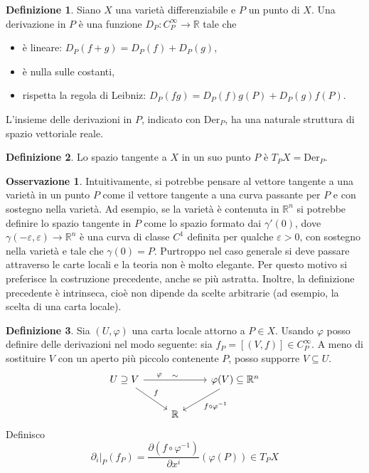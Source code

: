 \documentclass[a4paper,11pt]{article}
\theoremstyle{definition}
\newtheorem{osservazione}{Osservazione}[section]
\newtheorem{definizione}{Definizione}[section]
\theoremstyle{theorem}
\newcommand{\der}[1]{\mathrm{Der}_#1}
\begin{document}
\begin{definizione}
	Siano $X$ una varietà differenziabile e $P$ un punto di $X$. Una derivazione in $P$ è una funzione $D_P\colon C^\infty_P\to\mathbb{R}$ tale che 
	\begin{itemize}
		\item è lineare: $D_P(f+g)=D_P(f)+D_P(g)$,
		\item è nulla sulle costanti,
		\item rispetta la regola di Leibniz: $D_P(fg)=D_P(f)g(P)+D_P(g)f(P)$.
	\end{itemize}
	L'insieme delle derivazioni in $P$, indicato con $\der{P}$, ha una naturale struttura di spazio vettoriale reale.	
\end{definizione}
\begin{definizione}
	Lo spazio tangente a $X$ in un suo punto $P$ è $T_PX=\der{P}$.
\end{definizione}
\begin{osservazione}
Intuitivamente, si potrebbe pensare al vettore tangente a una varietà in un punto $P$ come il vettore tangente a una curva passante per $P$ e con sostegno nella varietà. Ad esempio, se la varietà è contenuta in $\mathbb{R}^n$ si potrebbe definire lo spazio tangente in $P$ come lo spazio formato dai $\gamma'(0)$, dove $\gamma(-\varepsilon,\varepsilon)\to\mathbb{R}^n$ è una curva di classe $C^1$ definita per qualche $\varepsilon>0$, con sostegno nella varietà e tale che $\gamma(0)=P$. Purtroppo nel caso generale si deve passare attraverso le carte locali e la teoria non è molto elegante. Per questo motivo si preferisce la costruzione precedente, anche se più astratta. Inoltre, la definizione precedente è intrinseca, cioè non dipende da scelte arbitrarie (ad esempio, la scelta di una carta locale).
\end{osservazione}
\begin{definizione}
	Sia $(U,\varphi)$ una carta locale attorno a $P\in X$. Usando $\varphi$ posso definire delle derivazioni nel modo seguente: sia $f_P=[(V,f)]\in C^\infty_P$. A meno di sostituire $V$ con un aperto più piccolo contenente $P$, posso supporre $V\subseteq U$.
	\[\begin{tikzcd}
	U\supseteq V\arrow[rr,"\sim", "\varphi" near start]\arrow[dr, "f"] & &\varphi(V)\subseteq \mathbb{R}^n\arrow[dl, "f\circ\varphi^{-1}"]\\
	& \mathbb{R}	
	\end{tikzcd}\]
	Definisco
	\[\left.\partial_i\right|_{P}(f_P)=\frac{\partial(f\circ\varphi^{-1})}{\partial x^i}(\varphi(P))\in T_PX\]
\end{definizione}
\end{document}
